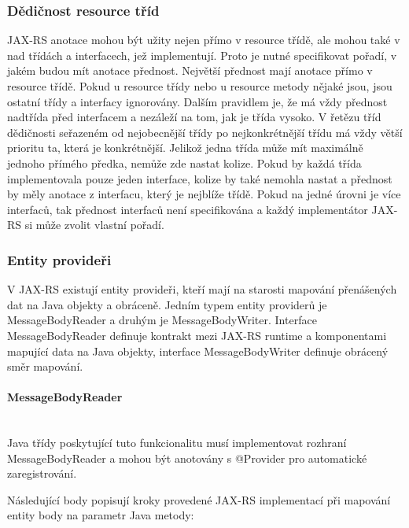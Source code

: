 \documentclass[11pt,twoside,a4paper]{book}
\begin{document}
\subsubsection{Dědičnost resource tříd}
\label{subsec:dedicnost-resource-trid}

JAX-RS anotace mohou být užity nejen přímo v resource třídě, ale mohou také v nad třídách a
interfacech, jež implementují. Proto je nutné specifikovat pořadí, v jakém budou mít anotace
přednost. Největší přednost mají anotace přímo v resource třídě. Pokud u resource třídy nebo
u resource metody nějaké jsou, jsou ostatní třídy a interfacy ignorovány. Dalším pravidlem je,
že má vždy přednost nadtřída před interfacem a nezáleží na tom, jak je třída vysoko. V řetězu
tříd dědičnosti seřazeném od nejobecnější třídy po nejkonkrétnější třídu má vždy větší prioritu
ta, která je konkrétnější. Jelikož jedna třída může mít maximálně jednoho přímého předka,
nemůže zde nastat kolize. Pokud by každá třída implementovala pouze jeden interface, kolize
by také nemohla nastat a přednost by měly anotace z interfacu, který je nejblíže třídě. Pokud
na jedné úrovni je více interfaců, tak přednost interfaců není specifikována a každý
implementátor JAX-RS si může zvolit vlastní pořadí.

\subsubsection{Entity provideři}

V JAX-RS existují entity provideři, kteří mají na starosti mapování přenášených
dat na Java objekty a obráceně. Jedním typem entity providerů je MessageBodyReader a druhým 
je MessageBodyWriter.  Interface MessageBodyReader definuje kontrakt mezi JAX-RS runtime a 
komponentami mapující data na Java objekty, interface MessageBodyWriter definuje obrácený 
směr mapování. 

\paragraph{MessageBodyReader}
\mbox{}\\

Java třídy poskytující tuto funkcionalitu musí implementovat rozhraní
MessageBodyReader a mohou být anotovány s @Provider pro automatické zaregistrování.

Následující body popisují kroky provedené JAX-RS implementací při mapování
entity body na parametr Java metody:
\end{document}
